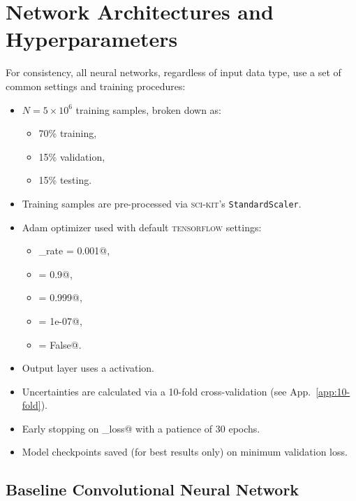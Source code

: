\documentclass[aps,prd,twocolumn,superscriptaddress,preprintnumbers,nofootinbib,longbibliography,floatfix]{revtex4-1}
\newcommand{\App}[1]{App.~\ref{#1}}
\begin{document}
\appendix

\section{Network Architectures and Hyperparameters}
\label{app:casestudy_nn}

For consistency, all neural networks, regardless of input data type, use a set of common settings and training procedures:
\begin{itemize}
	\item $N = 5\times 10^6$ training samples, broken down as:
	\begin{itemize}
		\item 70\% training,
		\item 15\% validation, 
		\item 15\% testing.
	\end{itemize} 
	\item Training samples are pre-processed via \textsc{sci-kit}'s \texttt{StandardScaler}.
	\item Adam optimizer used with default \textsc{tensorflow} settings: 
	\begin{itemize}
		\item \verb@learning_rate = 0.001@,
		\item {} = 0.9@,
		\item {} = 0.999@,
		\item \verb@epsilon = 1e-07@,
		\item \verb@amsgrad = False@.
	\end{itemize}
	\item Output layer uses a \verb@sigmoid@ activation.
	\item Uncertainties are calculated via a 10-fold cross-validation (see \App{app:10-fold}).
	\item Early stopping on \verb@validation_loss@ with a patience of 30 epochs.
	\item Model checkpoints saved (for best results only) on minimum validation loss.
\end{itemize}

\subsection{Baseline Convolutional Neural Network}
 \label{app:dnn_ll}
  
\end{document}
